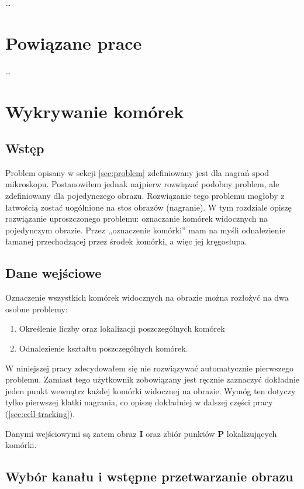 \documentclass[declaration,shortabstract,mgr]{iithesis}
\newcommand{\image}{\mathbf{I}}
\begin{document}
\ldots %

\section{Powiązane prace}

\ldots %

\section{Wykrywanie komórek}

\subsection{Wstęp}

Problem opisany w sekcji \ref{sec:problem} zdefiniowany jest dla nagrań spod mikroskopu. Postanowiłem jednak najpierw rozwiązać podobny problem, ale zdefiniowany dla pojedynczego obrazu. Rozwiązanie tego problemu mogłoby z łatwością zostać uogólnione na stos obrazów (nagranie). W tym rozdziale opiszę rozwiązanie uproszczonego problemu: oznaczanie komórek widocznych na pojedynczym obrazie. Przez ,,oznaczenie komórki'' mam na myśli odnalezienie łamanej przechodzącej przez środek komórki, a więc jej kręgosłupa.

\subsection{Dane wejściowe}

Oznaczenie wszystkich komórek widocznych na obrazie można rozłożyć na dwa osobne problemy:
\begin{enumerate}
  \item Określenie liczby oraz lokalizacji poszczególnych komórek
  \item Odnalezienie kształtu poszczególnych komórek.
\end{enumerate}

W niniejszej pracy zdecydowałem się nie rozwiązywać automatycznie pierwszego problemu. Zamiast tego użytkownik zobowiązany jest ręcznie zaznaczyć dokładnie jeden punkt wewnątrz każdej komórki widocznej na obrazie. Wymóg ten dotyczy tylko pierwszej klatki nagrania, co opiszę dokładniej w dalszej części pracy (\ref{sec:cell-tracking}).

Danymi wejściowymi są zatem obraz $\image$ oraz zbiór punktów $\mathbf{P}$ lokalizujących komórki.

\subsection{Wybór kanału i wstępne przetwarzanie obrazu}
\end{document}
